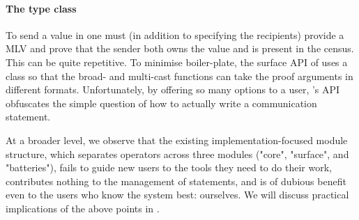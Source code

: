\paragraph{The  type class}
To send a value in \MultiChor one must (in addition to specifying the recipients)
provide a MLV and prove that the sender both owns the value and is present in the census.
This can be quite repetitive.
To minimise boiler-plate, the surface API of \MultiChor uses a class 
so that the broad- and multi-cast functions can take the proof arguments in different formats.
Unfortunately, by offering so many options to a user, \MultiChor's API obfuscates the simple question of how to actually write a communication statement.

At a broader level, we observe that the existing implementation-focused module structure,
which separates operators across three modules ("core", "surface", and "batteries"),
fails to guide new users to the tools they need to do their work,
contributes nothing to the management of  statements,
and is of dubious benefit even to the users who know the system best: ourselves.
We will discuss practical implications of the above points in .




